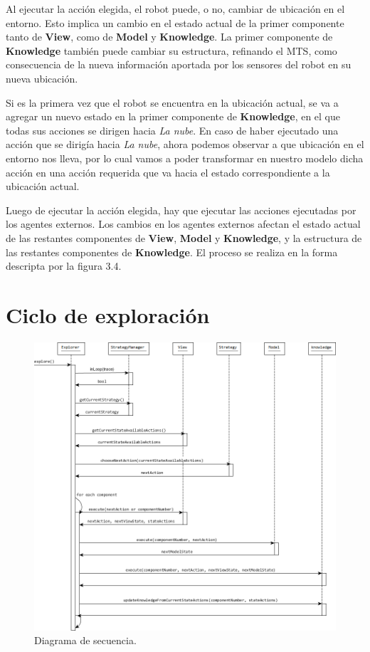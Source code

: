 Al ejecutar la acción elegida, el robot puede, o no, cambiar de ubicación en el entorno. Esto implica un cambio en el estado actual de la primer componente tanto 
de \textbf{View}, como de \textbf{Model} y \textbf{Knowledge}. La primer componente de \textbf{Knowledge} también puede cambiar su estructura, refinando el MTS,
como consecuencia de la nueva información aportada por los sensores del robot en su nueva ubicación.

\vspace{\baselineskip}
Si es la primera vez que el robot se encuentra en la ubicación actual, se va a agregar un nuevo estado en la primer componente de \textbf{Knowledge}, en el que todas
sus acciones se dirigen hacia \textit{La nube}. En caso de haber ejecutado una acción que se dirigía hacia \textit{La nube}, ahora podemos observar a que ubicación
en el entorno nos lleva, por lo cual vamos a poder transformar en nuestro modelo dicha acción en una acción requerida que va hacia el estado correspondiente
a la ubicación actual.

\vspace{\baselineskip}
Luego de ejecutar la acción elegida, hay que ejecutar las acciones ejecutadas por los agentes externos. Los cambios en los agentes externos afectan el estado actual
de las restantes componentes de \textbf{View}, \textbf{Model} y \textbf{Knowledge}, y la estructura de las restantes componentes de \textbf{Knowledge}. El proceso se
realiza en la forma descripta por la figura 3.4.

\section{Ciclo de exploración}

\begin{figure}[H]
  \centering
    \includegraphics[width=1.0\textwidth]{Imagenes/Algoritmo/Secuencia_explorar.png}
  \caption{Diagrama de secuencia.}
  \label{fig:Secuencia_explorar}
\end{figure}

